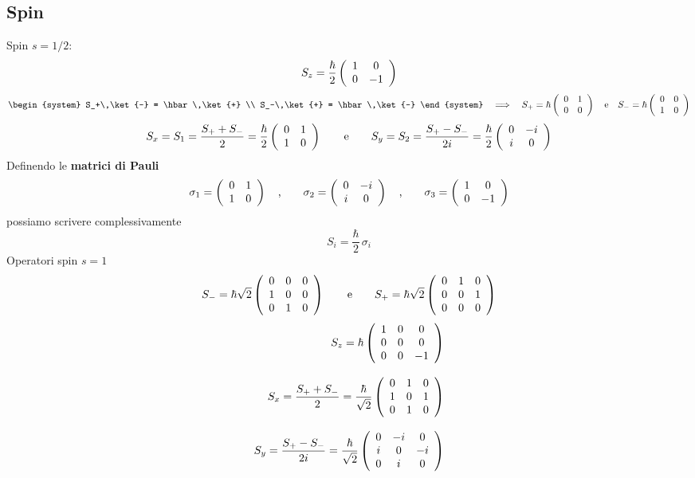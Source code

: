\subsection{Spin}



Spin $s = 1/2$:
$$ S_z = \frac{\hbar}{2}\matrice{2}{1&0\\0&-1} $$
\begin{equation}
	\label{spin:inn_abb:mah}
	\begin{system}
		S_+\,\ket{-} = \hbar\,\ket{+} \\ S_-\,\ket{+} = \hbar\,\ket{-}
	\end{system}
	\quad \Longrightarrow \quad
	S_+ = \hbar\matrice{2}{0 & 1 \\ 0 & 0} \quad \mbox{e} \quad S_- = \hbar\matrice{2}{0 & 0 \\ 1 & 0}
\end{equation}
\begin{equation}
	\label{spin:S1_S2}
	S_x = S_1 = \frac{S_+ + S_-}{2} = \frac{\hbar}{2}\matrice{2}{0 & 1 \\ 1 & 0}
	\qquad \mbox{e} \qquad
	S_y = S_2 = \frac{S_+ - S_-}{2i} = \frac{\hbar}{2}\matrice{2}{0 & -i \\ i & 0}
\end{equation}
%
Definendo le \textbf{matrici di Pauli}
\begin{equation}
	\label{mat_pauli}
	\sigma_1 = \matrice{2}{0&1\\1&0}\quad \mbox{,} \qquad
	\sigma_2 = \matrice{2}{0&-i\\i&0}\quad \mbox{,} \qquad
	\sigma_3 = \matrice{2}{1&0\\0&-1}
\end{equation}
possiamo scrivere complessivamente
\begin{equation}
	\label{spin:S123} \boxed{\quad S_i = \frac{\hbar}{2}\,\sigma_i \quad }
\end{equation}
%
%
Operatori spin $s = 1$
\begin{equation}
	\label{spin1:S+S-}
	S_- = \hbar\sqrt{2}\matrice{3}{0&0&0 \\ 1 & 0 & 0 \\ 0 & 1 & 0}
	\qquad \mbox{e} \qquad
	S_+ = \hbar\sqrt{2}\matrice{3}{0 & 1 & 0 \\ 0 & 0 & 1 \\ 0 & 0 & 0}
\end{equation}
\begin{subequations}
	\label{spin1:SxSySz}
	\begin{align}
		S_z = \hbar\matrice{3}{1&0&0\\0&0&0\\0&0&-1}\\[2ex]
		S_x = \frac{S_+ + S_-}{2} = \frac{\hbar}{\sqrt{2}}\matrice{3}{0&1&0\\1&0&1\\0&1&0}\\[2ex]
		S_y = \frac{S_+ - S_-}{2i} = \frac{\hbar}{\sqrt{2}}\matrice{3}{0&-i&0\\i&0&-i\\0&i&0}
	\end{align}
\end{subequations}
